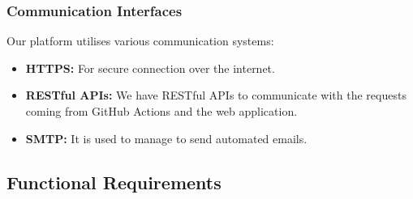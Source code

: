 \subsubsection{Communication Interfaces}
Our platform utilises various communication systems:

\begin{itemize}
    \item \textbf{HTTPS:} For secure connection over the internet.

    \item \textbf{RESTful APIs:} We have RESTful APIs to communicate with the requests coming from GitHub Actions and the web application.

    \item \textbf{SMTP:} It is used to manage to send automated emails.
\end{itemize}

\subsection{Functional Requirements}

